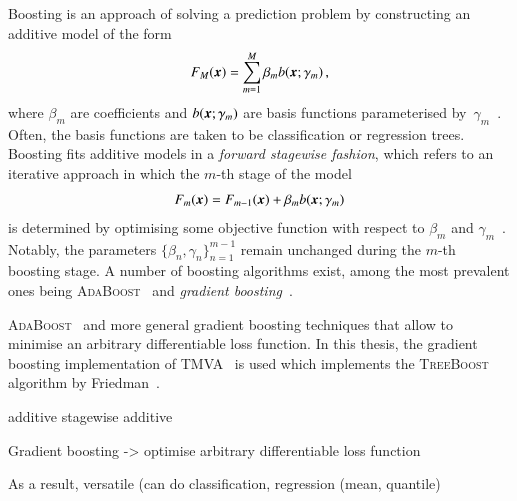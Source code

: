 Boosting is an approach of solving a prediction problem by constructing an
additive model of the form
\begin{align*}
  F_{M}(\myvec{x}) = \sum_{m = 1}^{M} \beta_m b(\myvec{x}; \gamma_{m}) \,\text{,}
\end{align*}
where $\beta_m$ are coefficients and $b(\myvec{x}; \gamma_{m})$ are basis
functions parameterised
by~$\gamma_{m}$~\cite{Friedman:2000,Friedman:2001wbq}. Often, the basis
functions are taken to be classification or regression trees. Boosting fits
additive models in a \emph{forward stagewise fashion}, which refers to an
iterative approach in which the $m$-th stage of the model
\begin{align*}
  F_{m}(\myvec{x}) = F_{m - 1}(\myvec{x}) + \beta_m b(\myvec{x}; \gamma_{m})
\end{align*}
is determined by optimising some objective function with respect to $\beta_{m}$
and $\gamma_{m}$~\cite{hastie09}. Notably, the parameters
$\{\beta_n, \gamma_n\}_{n = 1}^{m-1}$ remain unchanged during the $m$-th
boosting stage. A number of boosting algorithms exist, among the most prevalent
ones being
\textsc{AdaBoost}~\cite{freund_shapire:adaboost,freund_shapire:adaboost2} and
\emph{gradient boosting}~\cite{Friedman:2001wbq}.












\textsc{AdaBoost}~\cite{freund_shapire:adaboost,freund_shapire:adaboost2} and
more general gradient boosting techniques that allow to minimise an arbitrary
differentiable loss function.  In this thesis, the gradient boosting
implementation of TMVA~\cite{TMVA} is used which implements the
\textsc{TreeBoost} algorithm by Friedman~\cite{Friedman:2001wbq}.


additive stagewise additive

Gradient boosting -> optimise arbitrary differentiable loss function

As a result, versatile (can do classification, regression (mean, quantile)



